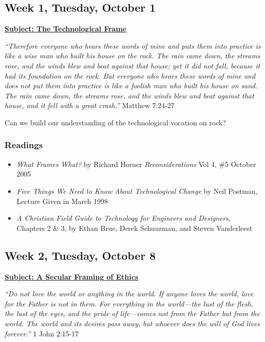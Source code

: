 \documentclass[12pt]{article}
\begin{document}
\subsection*{Week 1, Tuesday, October 1}
\label{sec:org7e600cb}
\textbf{\uline{Subject: The Technological Frame}}
\begin{mdframed}[nobreak=true]
\emph{“Therefore everyone who hears these words of mine and puts them into practice
is like a wise man who built his house on the rock. The rain came down, the
streams rose, and the winds blew and beat against that house; yet it did not
fall, because it had its foundation on the rock. But everyone who hears these
words of mine and does not put them into practice is like a foolish man who
built his house on sand. The rain came down, the streams rose, and the winds
blew and beat against that house, and it fell with a great crash.”} Matthew
7:24-27
\end{mdframed}

Can we build our understanding of the technological vocation on rock?
\subsubsection*{Readings}
\label{sec:org928a670}
\begin{itemize}
\item \emph{What Frames What?} by Richard Horner \emph{Reconsiderations} Vol 4, \#5 October
2005
\item \emph{Five Things We Need to Know About Technological Change} by Neil Postman,
Lecture Given in March 1998
\item \emph{A Christian Field Guide to Technology for Engineers and Designers}, Chapters
2 \& 3, by Ethan Brue, Derek Schuurman, and Steven Vanderleest
\end{itemize}
\subsection*{Week 2, Tuesday, October 8}
\label{sec:org3845837}
\textbf{\uline{Subject: A Secular Framing of Ethics}}
\begin{mdframed}[nobreak=true]
\emph{``Do not love the world or anything in the world. If anyone loves the world,
love for the Father is not in them. For everything in the world—the lust
of the flesh, the lust of the eyes, and the pride of life—comes not from the
Father but from the world. The world and its desires pass away, but whoever
does the will of God lives forever.''} 1 John 2:15-17
\end{mdframed}
\end{document}
